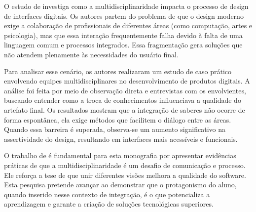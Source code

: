 O estudo de  investiga como a multidisciplinaridade
impacta o processo de design de interfaces digitais. Os autores partem do
problema de que o design moderno exige a colaboração de profissionais de
diferentes áreas (como computação, artes e psicologia), mas que essa interação
frequentemente falha devido à falta de uma linguagem comum e processos
integrados. Essa fragmentação gera soluções que não atendem plenamente às
necessidades do usuário final.

Para analisar esse cenário, os autores realizaram um estudo de caso prático
envolvendo equipes multidisciplinares no desenvolvimento de produtos digitais.
A análise foi feita por meio de observação direta e entrevistas com os
envolvientes, buscando entender como a troca de conhecimentos influenciava a
qualidade do artefato final. Os resultados mostram que a integração de saberes
não ocorre de forma espontânea, ela exige métodos que facilitem o diálogo entre
as áreas. Quando essa barreira é superada, observa-se um aumento significativo
na assertividade do design, resultando em interfaces mais acessíveis e
funcionais.

O trabalho de  é fundamental para esta monografia por
apresentar evidências práticas de que a multidisciplinaridade é um desafio de
comunicação e processo. Ele reforça a tese de que unir diferentes visões
melhora a qualidade do software. Esta pesquisa pretende avançar ao demonstrar
que o protagonismo do aluno, quando inserido nesse contexto de integração, é o
que potencializa a aprendizagem e garante a criação de soluções tecnológicas
superiores.

